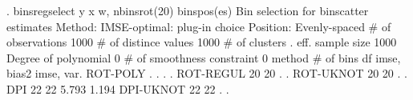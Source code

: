 . binsregselect y x w, nbinsrot(20) binspos(es)
{\smallskip}
{\smallskip}
Bin selection for binscatter estimates
Method: IMSE-optimal: plug-in choice
Position: Evenly-spaced
{\smallskip}
          \# of observations {\VBAR}    1000
       \# of distince values {\VBAR}    1000
              \# of clusters {\VBAR}       .
           eff. sample size {\VBAR}    1000
       Degree of polynomial {\VBAR}       0
 \# of smoothness constraint {\VBAR}       0
{\smallskip}
    method    {\VBAR}  \# of bins {\VBAR}     df   {\VBAR} imse, bias{\caret}2 {\VBAR}  imse, var.  
   ROT-POLY   {\VBAR}       .    {\VBAR}      .   {\VBAR}        .     {\VBAR}        .
   ROT-REGUL  {\VBAR}      20    {\VBAR}     20   {\VBAR}        .     {\VBAR}        .
   ROT-UKNOT  {\VBAR}      20    {\VBAR}     20   {\VBAR}        .     {\VBAR}        .
      DPI     {\VBAR}      22    {\VBAR}     22   {\VBAR}    5.793     {\VBAR}    1.194
   DPI-UKNOT  {\VBAR}      22    {\VBAR}     22   {\VBAR}        .     {\VBAR}        .
